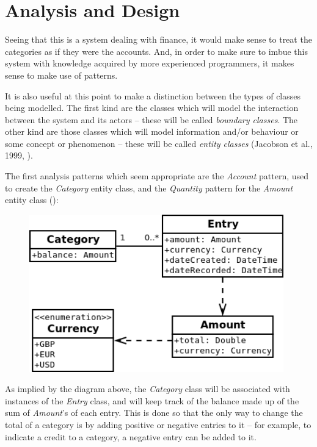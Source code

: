 \section{Analysis and Design} \label{sec:Design}

Seeing that this is a system dealing with finance, it would make sense to treat
the categories as if they were the accounts. And, in order to make sure to
imbue this system with knowledge acquired by more experienced programmers, it
makes sense to make use of patterns.

It is also useful at this point to make a distinction between the types of
classes being modelled. The first kind are the classes which will model the
interaction between the system and its actors -- these will be called
\emph{boundary classes}. The other kind are those classes which will model
information and/or behaviour or some concept or phenomenon -- these will be
called \emph{entity classes} (Jacobson et al.,
1999, \cite[cited][pp.~198-199]{bennett2010object}).

The first analysis patterns which seem appropriate are the \emph{Account}
pattern, used to create the \emph{Category} entity class, and the
\emph{Quantity} pattern for the \emph{Amount} entity class
(\cite[][Sections~6.1~\&~3.1]{fowler1997analysis}):
\begin{figure}[ht!]
  \begin{center}
    \includegraphics[width=11cm]{./contents/img/Class_Diagram_-_Categories_and_Amount.png}
  \end{center}
\end{figure}
\FloatBarrier

As implied by the diagram above, the \emph{Category} class will be associated
with instances of the \emph{Entry} class, and will keep track of the balance
made up of the sum of \emph{Amount}'s of each entry. This is done so that the
only way to change the total of a category is by adding positive or negative
entries to it -- for example, to indicate a credit to a category, a negative
entry can be added to it.

